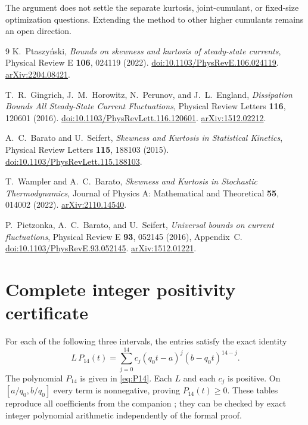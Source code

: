 \documentclass[11pt,a4paper]{article}
\numberwithin{equation}{section}
\theoremstyle{remark}
\newcommand{\Lean}[1]{\texttt{\detokenize{#1}}}
\begin{document}
The argument does not settle the separate kurtosis, joint-cumulant, or
fixed-size optimization questions. Extending the method to other higher
cumulants remains an open direction.

\clearpage
\begin{thebibliography}{9}
K.~Ptaszy\'nski,
\emph{Bounds on skewness and kurtosis of steady-state currents},
Physical Review E \textbf{106}, 024119 (2022).
\href{https://doi.org/10.1103/PhysRevE.106.024119}{doi:10.1103/PhysRevE.106.024119}.
\href{https://arxiv.org/abs/2204.08421}{arXiv:2204.08421}.

T.~R.~Gingrich, J.~M.~Horowitz, N.~Perunov, and J.~L.~England,
\emph{Dissipation Bounds All Steady-State Current Fluctuations},
Physical Review Letters \textbf{116}, 120601 (2016).
\href{https://doi.org/10.1103/PhysRevLett.116.120601}{doi:10.1103/PhysRevLett.116.120601}.
\href{https://arxiv.org/abs/1512.02212}{arXiv:1512.02212}.

A.~C.~Barato and U.~Seifert,
\emph{Skewness and Kurtosis in Statistical Kinetics},
Physical Review Letters \textbf{115}, 188103 (2015).
\href{https://doi.org/10.1103/PhysRevLett.115.188103}{doi:10.1103/PhysRevLett.115.188103}.

T.~Wampler and A.~C.~Barato,
\emph{Skewness and Kurtosis in Stochastic Thermodynamics},
Journal of Physics A: Mathematical and Theoretical \textbf{55}, 014002 (2022).
\href{https://arxiv.org/abs/2110.14540}{arXiv:2110.14540}.

P.~Pietzonka, A.~C.~Barato, and U.~Seifert,
\emph{Universal bounds on current fluctuations},
Physical Review E \textbf{93}, 052145 (2016), Appendix~C.
\href{https://doi.org/10.1103/PhysRevE.93.052145}{doi:10.1103/PhysRevE.93.052145}.
\href{https://arxiv.org/abs/1512.01221}{arXiv:1512.01221}.
\end{thebibliography}

\appendix
\clearpage
\section{Complete integer positivity certificate}\label{app:certificate}
For each of the following three intervals, the entries satisfy the exact
identity
\[
 L\,P_{14}(t)=\sum_{j=0}^{14}c_j(q_0t-a)^j(b-q_0t)^{14-j}.
\]
The polynomial $P_{14}$ is given in \eqref{eq:P14}. Each $L$ and each $c_j$
is positive. On $[a/q_0,b/q_0]$ every term is nonnegative, proving
$P_{14}(t)\ge0$. These tables reproduce all coefficients from the companion
\Lean{certificate.json}; they can be checked by exact integer
polynomial arithmetic independently of the formal proof.

\end{document}
